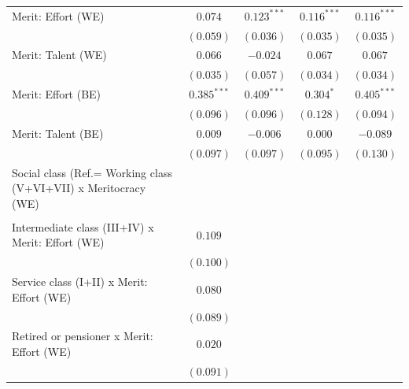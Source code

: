 \documentclass[
  12pt,
]{article}
\begin{document}
\begin{table}
{\begin{center}
{\begin{tabular}{l c c c c}
Merit: Effort (WE)                                              & $0.074$       & $0.123^{***}$ & $0.116^{***}$ & $0.116^{***}$ \\
                                                                & $(0.059)$     & $(0.036)$     & $(0.035)$     & $(0.035)$     \\
Merit: Talent (WE)                                              & $0.066$       & $-0.024$      & $0.067$       & $0.067$       \\
                                                                & $(0.035)$     & $(0.057)$     & $(0.034)$     & $(0.034)$     \\
Merit: Effort (BE)                                              & $0.385^{***}$ & $0.409^{***}$ & $0.304^{*}$   & $0.405^{***}$ \\
                                                                & $(0.096)$     & $(0.096)$     & $(0.128)$     & $(0.094)$     \\
Merit: Talent (BE)                                              & $0.009$       & $-0.006$      & $0.000$       & $-0.089$      \\
                                                                & $(0.097)$     & $(0.097)$     & $(0.095)$     & $(0.130)$     \\
Social class (Ref.= Working class (V+VI+VII) x Meritocracy (WE) &               &               &               &               \\
                                                                &               &               &               &               \\
\quad Intermediate class (III+IV) x Merit: Effort (WE)          & $0.109$       &               &               &               \\
                                                                & $(0.100)$     &               &               &               \\
\quad Service class (I+II) x Merit: Effort (WE)                 & $0.080$       &               &               &               \\
                                                                & $(0.089)$     &               &               &               \\
\quad Retired or pensioner x Merit: Effort (WE)                 & $0.020$       &               &               &               \\
                                                                & $(0.091)$     &               &               &               \\

\end{tabular}}
\end{center}}
\end{table}
\end{document}
